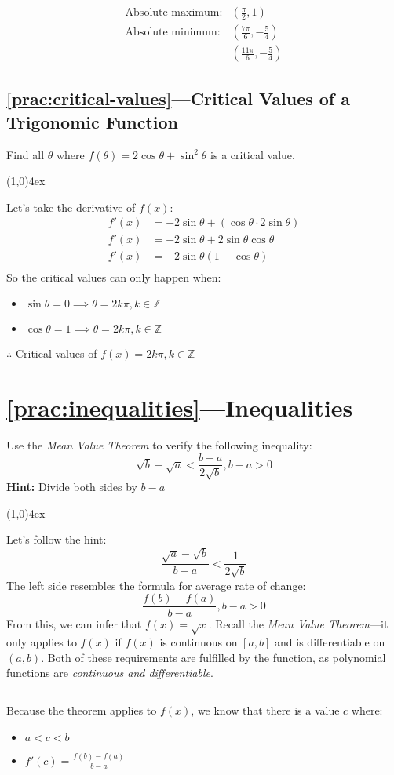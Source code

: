 \documentclass{MathNotes}
\newcommand{\br}{
	\begin{center}
		\line(1,0){4ex}
	\end{center}}
\newcommand{\bl}{
	\newline$ $\newline
}
\begin{document}
\begin{align*}
	\text{Absolute maximum:} & (\frac{\pi}{2}, 1)              \\
	\text{Absolute minimum:} & (\frac{7\pi}{6}, -\frac{5}{4})  \\
	                         & (\frac{11\pi}{6}, -\frac{5}{4})
\end{align*}

\subsection*{\ref{prac:critical-values}---Critical Values of a Trigonomic Function}
\label{ans:critical-values}
Find all $\theta$ where $\displaystyle f(\theta)=2\cos\theta+\sin^2\theta$
is a critical value.
\br
Let's take the derivative of $f(x)$:
\begin{align*}
	f'(x) & =-2\sin\theta+(\cos\theta\cdot 2\sin\theta) \\
	f'(x) & =-2\sin\theta+2\sin\theta\cos\theta         \\
	f'(x) & =-2\sin\theta(1 - \cos\theta)               \\
\end{align*}
So the critical values can only happen when:
\begin{multicols}{2}
	\begin{itemize}
		\item $\sin\theta=0\implies\theta=2k\pi,k\in\mathbb{Z}$
		\item $\cos\theta=1\implies\theta=2k\pi,k\in\mathbb{Z}$
	\end{itemize}
\end{multicols}
$\therefore$ Critical values of $f(x)=2k\pi,k\in\mathbb{Z}$

\newpage
\section*{\ref{prac:inequalities}---Inequalities}\label{ans:inequalities}
Use the \textit{Mean Value Theorem} to verify the following inequality:
$$\sqrt{b}-\sqrt{a}<\frac{b-a}{2\sqrt{b}},b-a>0$$
\textbf{Hint:} Divide both sides by $b-a$
\br
Let's follow the hint:$$\frac{\sqrt{a}-\sqrt{b}}{b-a}<\frac{1}{2\sqrt{b}}$$
The left side resembles the formula for average rate of change:
$$\frac{f(b)-f(a)}{b-a},b-a>0$$
From this, we can infer that $f(x)=\sqrt{x}$. Recall the \textit{Mean Value
	Theorem}---it only applies to $f(x)$ if $f(x)$ is continuous on $[a, b]$ and
is differentiable on $(a, b)$. Both of these requirements are fulfilled by the
function, as polynomial functions are \textit{continuous and differentiable}.
\bl
Because the theorem applies to $f(x)$, we know that there is a value $c$ where:
\begin{multicols}{2}
	\begin{itemize}
		\item $a<c<b$
		\item $f'(c)=\frac{f(b)-f(a)}{b-a}$
	\end{itemize}
\end{multicols}
\end{document}
